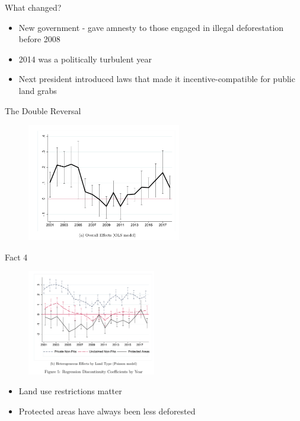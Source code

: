 \documentclass[11pt,notes=hide,aspectratio=169,mathserif]{beamer}
\begin{document}
\begin{frame}{What changed?}
\begin{itemize}
\item New government - gave amnesty to those engaged in illegal deforestation before 2008
\item 2014 was a politically turbulent year
\item Next president introduced laws that made it incentive-compatible for public land grabs
\end{itemize}
\end{frame}

\begin{frame}{The Double Reversal}
\begin{figure}
\centering
\includegraphics[width=0.6\textwidth]{../TA9/inputs/reversal.png}
\end{figure}
\end{frame}

\begin{frame}{Fact 4}
\begin{figure}
\centering
\includegraphics[width=0.5\textwidth]{../TA9/inputs/fig_land_use.png}
\end{figure}
\begin{itemize}
\item Land use restrictions matter 
\item Protected areas have always been less deforested
\end{itemize}
\end{frame}
\end{document}
